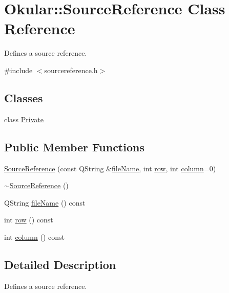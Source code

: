 \hypertarget{classOkular_1_1SourceReference}{\section{Okular\+:\+:Source\+Reference Class Reference}
\label{classOkular_1_1SourceReference}
}


Defines a source reference.  




{\ttfamily \#include $<$sourcereference.\+h$>$}

\subsection*{Classes}
\begin{DoxyCompactItemize}
\item 
class \hyperlink{classSourceReference_1_1Private}{Private}
\end{DoxyCompactItemize}
\subsection*{Public Member Functions}
\begin{DoxyCompactItemize}
\item 
\hyperlink{classOkular_1_1SourceReference_af2e521ac88b10dd8b6be9d567c264ede}{Source\+Reference} (const Q\+String \&\hyperlink{classOkular_1_1SourceReference_acde61d4bdc6c59d9d01ff03dfe0f25fe}{file\+Name}, int \hyperlink{classOkular_1_1SourceReference_aa5633f3cdccd86c1a2cdf5e3ccf7956f}{row}, int \hyperlink{classOkular_1_1SourceReference_ad7bb96f1bad08bd0b03a1e021291a598}{column}=0)
\item 
\hyperlink{classOkular_1_1SourceReference_adb5d4db2f74f62c3b1f963cb3351548b}{$\sim$\+Source\+Reference} ()
\item 
Q\+String \hyperlink{classOkular_1_1SourceReference_acde61d4bdc6c59d9d01ff03dfe0f25fe}{file\+Name} () const 
\item 
int \hyperlink{classOkular_1_1SourceReference_aa5633f3cdccd86c1a2cdf5e3ccf7956f}{row} () const 
\item 
int \hyperlink{classOkular_1_1SourceReference_ad7bb96f1bad08bd0b03a1e021291a598}{column} () const 
\end{DoxyCompactItemize}


\subsection{Detailed Description}
Defines a source reference. 

